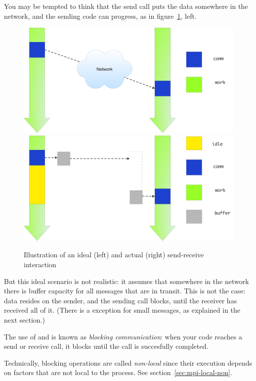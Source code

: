 You may be tempted to think that the send call puts the data somewhere
in the network, and the sending code can progress,
as in figure~\ref{fig:send-ideal}, left.
%
\begin{figure}[ht]
\leavevmode
\includegraphics[scale=.08]{graphics/send-ideal}
\includegraphics[scale=.08]{graphics/send-blocking}
\caption{Illustration of an ideal (left) and actual (right) send-receive interaction}
\label{fig:send-ideal}
\end{figure}
%
But this ideal scenario is not realistic: it assumes that somewhere
in the network there is buffer capacity for all messages that are in
transit.
This is not the case: data resides on the sender, and the sending call blocks,
until the receiver has received all of it. (There is a exception for
small messages, as explained in the next section.)

The use of  and 
is known as \emph{blocking communication}: when your code reaches a
send or receive call, it blocks until the call is succesfully completed.

Technically, blocking operations are called
\emph{non-local} since their execution
depends on factors that are not local to the process.
See section~\ref{sec:mpi-local-non}.

